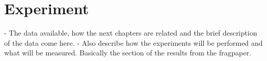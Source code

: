 
\chapter{Experiment}\label{ch:experiment}

- The data available, how the next chapters are related and the brief description of the data come here.
- Also describe how the experiments will be performed and what will be measured. Basically the section of the results from the fragpaper.

